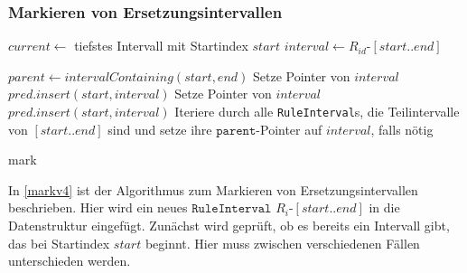 \subsubsection{Markieren von Ersetzungsintervallen}

\begin{algorithm}[t]
    $current \leftarrow$ tiefstes Intervall mit Startindex $start$\;
    $interval \leftarrow R_{id}$-$[start..end]$\;

     {
        $parent \leftarrow intervalContaining(start, end)$\;
        Setze Pointer von $interval$\;
        $pred.insert(start, interval)$\;
    }
     {
        Setze Pointer von $interval$
        $pred.insert(start, interval)$\;
    }
    Iteriere durch alle \texttt{RuleInterval}s, die Teilintervalle von $[start..end]$ sind und setze ihre $\texttt{parent}$-Pointer auf $interval$, falls nötig\;
    \caption{mark}
    \label{markv4}
\end{algorithm}

In \autoref{markv4} ist der Algorithmus zum Markieren von Ersetzungsintervallen beschrieben.
Hier  wird ein neues $\texttt{RuleInterval}$ $R_i$-$[start..end]$ in die Datenstruktur eingefügt. 
Zunächst wird geprüft, ob es bereits ein Intervall gibt, das bei Startindex $start$ beginnt.
Hier muss zwischen verschiedenen Fällen unterschieden werden.

